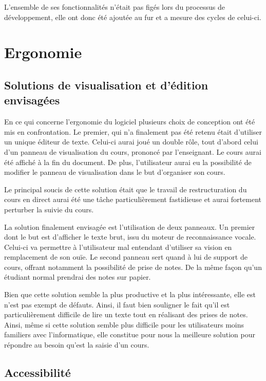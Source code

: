 L'ensemble de ses fonctionnalités n'était pas figés lors du processus de développement, elle ont donc été ajoutée au fur et a mesure des cycles de celui-ci.

\section{Ergonomie}

\subsection{Solutions de visualisation et d'édition envisagées}

En ce qui concerne l'ergonomie du logiciel plusieurs choix de conception ont été mis en confrontation. Le premier, qui n'a finalement pas été retenu était d'utiliser un unique éditeur de texte. Celui-ci aurai joué un  double rôle, tout d'abord celui d'un panneau de visualisation du cours, prononcé par l'enseignant. Le cours aurai été affiché à la fin du document. De plus, l'utilisateur aurai eu la possibilité de modifier le panneau de visualisation dans le but d'organiser son  cours.

Le principal soucis de cette solution était que le travail de restructuration du cours en direct aurai été une tâche particulièrement fastidieuse et aurai fortement perturber la suivie du cours.

La solution finalement envisagée est l'utilisation de deux panneaux. Un premier dont le but est d'afficher le texte brut, issu du moteur de reconnaissance vocale. Celui-ci  va permettre à l'utilisateur mal entendant d'utiliser sa  vision en remplacement de son ouïe. Le second panneau sert quand à lui de support de cours, offrant notamment la possibilité de prise de notes. De la même façon qu'un étudiant normal prendrai des notes sur papier.

Bien que cette solution semble la plus productive et la plus intéressante, elle est n'est pas exempt de défauts. Ainsi, il faut bien souligner le fait qu'il est particulièrement difficile de lire un texte tout en réalisant des prises de notes. Ainsi, même si cette solution semble plus difficile pour les utilisateurs moins familiers avec l'informatique, elle constitue pour nous la meilleure solution pour répondre au besoin qu'est la saisie d'un cours.




\subsection{Accessibilité}

